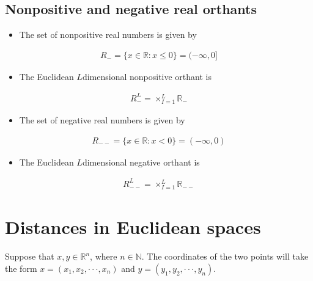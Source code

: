\documentclass[letterpaper,10pt,english]{jupyterBook}
\begin{document}
\subsection{Non\sphinxhyphen{}positive and negative real orthants}
\label{\detokenize{02.sets_numbers_coordinates_distances:non-positive-and-negative-real-orthants}}\begin{itemize}
\item {} 
\sphinxAtStartPar
The set of non\sphinxhyphen{}positive real numbers is given by

\end{itemize}
\begin{equation*}
\begin{split}R_- = \{x \in \mathbb{R} : x \leqslant 0\} = (-\infty, 0]\end{split}
\end{equation*}\begin{itemize}
\item {} 
\sphinxAtStartPar
The Euclidean \(L\)\sphinxhyphen{}dimensional non\sphinxhyphen{}positive orthant is

\end{itemize}
\begin{equation*}
\begin{split}R^L_- = \times_{I = 1}^L \mathbb{R}_-\end{split}
\end{equation*}\begin{itemize}
\item {} 
\sphinxAtStartPar
The set of negative real numbers is given by

\end{itemize}
\begin{equation*}
\begin{split}R_{--} = \{x \in \mathbb{R} : x < 0\} = (-\infty, 0)\end{split}
\end{equation*}\begin{itemize}
\item {} 
\sphinxAtStartPar
The Euclidean \(L\)\sphinxhyphen{}dimensional negative orthant is

\end{itemize}
\begin{equation*}
\begin{split}R^L_{--} = \times_{I = 1}^L \mathbb{R}_{--}\end{split}
\end{equation*}

\section{Distances in Euclidean spaces}
\label{\detokenize{02.sets_numbers_coordinates_distances:distances-in-euclidean-spaces}}
\sphinxAtStartPar
Suppose that \(x, y \in \mathbb{R}^n\), where \(n \in \mathbb{N}\). The coordinates of the two points will take the form \(x = (x_1, x_2, · · · , x_n)\) and \(y = (y_1, y_2, · · · , y_n)\).
\end{document}
